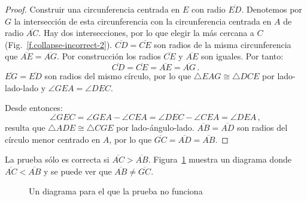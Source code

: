 \begin{proof}
Construir una circunferencia centrada en $E$ con radio $\overline{ED}$. Denotemos por $G$ la intersección de esta circunferencia con la circunferencia centrada en $A$ de radio $\overline{AC}$. Hay dos intersecciones, por lo que elegir la más cercana a $C$ (Fig.~\ref{f.collapse-incorrect-2}).
$\overline{CD}=\overline{CE}$ son radios de la misma circunferencia que $\overline{AE}=\overline{AG}$. Por construcción los radios $\overline{CE}$ y $\overline{AE}$ son iguales. Por tanto:
\[
\overline{CD} = \overline{CE} = \overline{AE} = \overline{AG}\,.
\]
$\overline{EG} = \overline{ED}$ son radios del mismo círculo, por lo que $\triangle EAG\cong \triangle DCE$ por lado-lado-lado y $\angle GEA = \angle DEC$.

Desde entonces:
\[
\angle GEC = \angle GEA \!-\!\angle CEA = \angle DEC\!-\!\angle CEA = \angle DEA\,,
\]
resulta que $\triangle ADE\cong\triangle CGE$ por lado-ángulo-lado. $\overline{AB}=\overline{AD}$ son radios del círculo menor centrado en $A$, por lo que $\overline{GC}=\overline{AD}=\overline{AB}$.
\end{proof}

La prueba sólo es correcta si $\overline{AC}>\overline{AB}$.  Figura~\ref{f.collapse-incorrect-4} muestra un diagrama donde $\overline{AC}<\overline{AB}$ y se puede ver que $\overline{AB}\neq\overline{GC}$.

\begin{figure}[b]
\begin{center}
\end{center}
\caption{Un diagrama para el que la prueba no funciona}\label{f.collapse-incorrect-4}
\end{figure}


